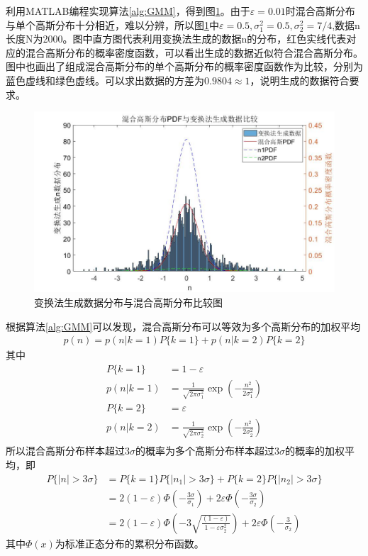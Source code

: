 \documentclass[fontset=windows]{article}
\numberwithin{figure}{section}
\begin{document}
利用MATLAB编程实现算法\ref*{alg:GMM}，得到图\ref*{fig:3}。由于\(\varepsilon=0.01\)时混合高斯分布与单个高斯分布十分相近，难以分辨，所以图\ref*{fig:3}中\(\varepsilon=0.5,\sigma_1^2=0.5,\sigma^2_2=7/4\),数据n长度N为2000。图中直方图代表利用变换法生成的数据n的分布，红色实线代表对应的混合高斯分布的概率密度函数，可以看出生成的数据近似符合混合高斯分布。图中也画出了组成混合高斯分布的单个高斯分布的概率密度函数作为比较，分别为蓝色虚线和绿色虚线。可以求出数据的方差为\(0.9804\approx1\)，说明生成的数据符合要求。

\begin{figure}[H]
    \centering
    \includegraphics[scale=0.4]{5.jpg}
    \caption{变换法生成数据分布与混合高斯分布比较图}
    \label{fig:3}
\end{figure}

根据算法\ref*{alg:GMM}可以发现，混合高斯分布可以等效为多个高斯分布的加权平均
\begin{align*}
    p(n)=p(n|k=1)P\{k=1\}+p(n|k=2)P\{k=2\}
\end{align*}
其中
\begin{align*}
    P\{k=1\} & =1-\varepsilon                                                             \\
    p(n|k=1) & =\frac{1}{\sqrt{2\pi \sigma^2_1}}\exp\left(-\frac{n^2}{2\sigma^2_1}\right) \\
    P\{k=2\} & =\varepsilon                                                               \\
    p(n|k=2) & =\frac{1}{\sqrt{2\pi \sigma^2_2}}\exp\left(-\frac{n^2}{2\sigma^2_2}\right) \\
\end{align*}
所以混合高斯分布样本超过\(3\sigma\)的概率为多个高斯分布样本超过\(3\sigma\)的概率的加权平均，即
\begin{align*}
    P\{\vert n\vert>3\sigma\}
     & =P\{k=1\}P\{\vert n_1\vert>3\sigma\}+P\{k=2\}P\{\vert n_2\vert>3\sigma\}                                              \\
     & =2(1-\varepsilon)\Phi(-\frac{3\sigma}{\sigma_1})+2\varepsilon \Phi(-\frac{3\sigma}{\sigma_2})                         \\
     & =2(1-\varepsilon)\Phi(-3\sqrt{\frac{(1-\varepsilon)}{1-\varepsilon\sigma_2^2}})+2\varepsilon\Phi(-\frac{3}{\sigma_2})
\end{align*}
其中\(\Phi(x)\)为标准正态分布的累积分布函数。
\end{document}
